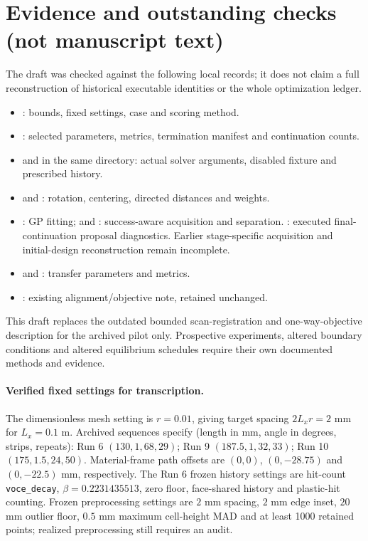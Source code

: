 \documentclass[11pt]{article}
\begin{document}
\section{Evidence and outstanding checks (not manuscript text)}
The draft was checked against the following local records; it does not claim a full reconstruction of historical executable identities or the whole optimization ledger.
\begin{itemize}
\item {}: bounds, fixed settings, case and scoring method.
\item {}: selected parameters, metrics, termination manifest and continuation counts.
\item {} and  in the same directory: actual solver arguments, disabled fixture and prescribed history.
\item {} and : rotation, centering, directed distances and weights.
\item {}: GP fitting;  and : success-aware acquisition and separation. : executed final-continuation proposal diagnostics. Earlier stage-specific acquisition and initial-design reconstruction remain incomplete.
\item {} and : transfer parameters and metrics.
\item {}: existing alignment/objective note, retained unchanged.
\end{itemize}
This draft replaces the outdated bounded scan-registration and one-way-objective description for the archived pilot only. Prospective experiments, altered boundary conditions and altered equilibrium schedules require their own documented methods and evidence.
\paragraph{Verified fixed settings for transcription.}
The dimensionless mesh setting is $r=0.01$, giving target spacing $2L_xr=2$ mm for $L_x=0.1$ m. Archived sequences specify (length in mm, angle in degrees, strips, repeats): Run 6 $(130,1,68,29)$; Run 9 $(187.5,1,32,33)$; Run 10 $(175,1.5,24,50)$. Material-frame path offsets are $(0,0)$, $(0,-28.75)$ and $(0,-22.5)$ mm, respectively. The Run 6 frozen history settings are hit-count \texttt{voce\_decay}, $\beta=0.2231435513$, zero floor, face-shared history and plastic-hit counting. Frozen preprocessing settings are $2$ mm spacing, $2$ mm edge inset, $20$ mm outlier floor, $0.5$ mm maximum cell-height MAD and at least 1000 retained points; realized preprocessing still requires an audit.
\end{document}
